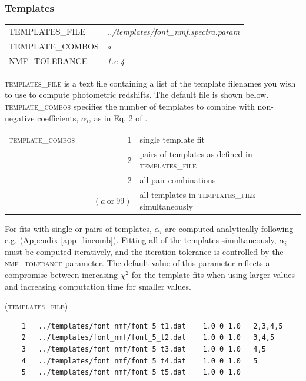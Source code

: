 \documentclass[11pt]{article}
\begin{document}

\subsubsection{Templates} \label{s:template_params}
\begin{tabular}{ll}
 \textsc{TEMPLATES\_FILE} & \textsl{       ../templates/font\_nmf.spectra.param } \\
 \textsc{TEMPLATE\_COMBOS } & \textsl{     a                } \\
 \textsc{NMF\_TOLERANCE} & \textsl{        1.e-4           } \\
\end{tabular}
\vspace*{0.5cm}

\textsc{templates\_file} is a text file containing a list of the template
filenames you wish to use to compute photometric redshifts.  The default file
is shown below.  \textsc{template\_combos} specifies the number of templates to
combine with non-negative coefficients, $\alpha_i$, as in Eq. 2 of \cite{eazy_paper}.  

\vspace*{0.25cm}
\begin{tabular}{lrl}
 \textsc{template\_combos}\ =&1 &  \textrm{single template fit} \\
 &2 & \textrm{pairs of templates as defined in \textsc{templates\_file}}\\
 & $-2$ & \textrm{all pair combinations} \\
 &$(a\ \mathrm{or}\ 99)$ &  \textrm{all templates in \textsc{templates\_file} simultaneously}
\end{tabular}

\vspace*{0.25cm} For fits with single or pairs of templates, $\alpha_i$ are
computed analytically following e.g. \cite{bevington} (Appendix
\ref{app_lincomb}).  Fitting all of the templates simultaneously, $\alpha_i$
must be computed iteratively, and the iteration tolerance is controlled by the
\textsc{nmf\_tolerance} parameter.  The default value of this parameter
reflects a compromise between increasing $\chi^2$ for the template fits when
using larger values and increasing computation time for smaller values.

\vspace*{0.25cm}\textsc{(templates\_file)}\vspace*{-0.4cm}
\begin{verbatim}
    1   ../templates/font_nmf/font_5_t1.dat    1.0 0 1.0   2,3,4,5
    2   ../templates/font_nmf/font_5_t2.dat    1.0 0 1.0   3,4,5
    3   ../templates/font_nmf/font_5_t3.dat    1.0 0 1.0   4,5
    4   ../templates/font_nmf/font_5_t4.dat    1.0 0 1.0   5
    5   ../templates/font_nmf/font_5_t5.dat    1.0 0 1.0   
\end{verbatim}
\end{document}
